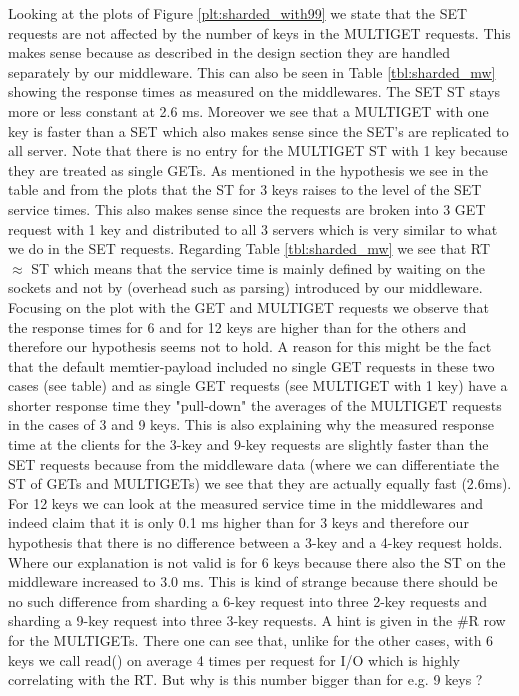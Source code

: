 \documentclass[11pt,a4paper]{article}
\begin{document}
Looking at the plots of Figure \ref{plt:sharded_with99} we state that the SET requests are not affected by the number of keys in the MULTIGET requests. This makes sense because as described in the design section they are handled separately by our middleware. This can also be seen in Table \ref{tbl:sharded_mw} showing the response times as measured on the middlewares. The SET ST stays more or less constant at 2.6 ms. Moreover we see that a MULTIGET with one key is faster  than a SET which also makes sense since the SET's are replicated to all server. Note that there is no entry for the MULTIGET ST with 1 key because they are treated as single GETs. As mentioned in the hypothesis we see in the table and from the plots that the ST for 3 keys raises to the level of the SET service times. This also makes sense since the requests are broken into 3 GET request with 1 key and distributed to all 3 servers which is very similar to what we do in the SET requests. Regarding Table \ref{tbl:sharded_mw} we see that RT $\approx$ ST which means that the service time is mainly defined by waiting on the sockets and not by (overhead such as parsing) introduced by our middleware. Focusing on the plot with the GET and MULTIGET requests we observe that the response times for 6 and for 12 keys are higher than for the others and therefore our hypothesis seems not to hold. A reason for this might be the fact that the default memtier-payload included no single GET requests in these two cases (see table) and as single GET requests (see MULTIGET with 1 key) have a shorter response time they "pull-down" the averages of the MULTIGET requests in the cases of 3 and 9 keys. This is also explaining why the measured response time at the clients for the 3-key and 9-key requests are slightly faster than the SET requests because from the middleware data (where we can differentiate the ST of GETs and MULTIGETs) we see that they are actually equally fast (2.6ms). For 12 keys we can look at the measured service time in the middlewares and indeed claim that it is only 0.1 ms higher than for 3 keys and therefore our hypothesis that there is no difference between a 3-key and a 4-key request holds. Where our explanation is not valid is for 6 keys because there also the ST on the middleware increased to 3.0 ms. This is kind of strange because there should be no such difference from sharding a 6-key request into three 2-key requests and sharding a 9-key request into three 3-key requests. A hint is given in the \#R row for the MULTIGETs. There one can see that, unlike for the other cases, with 6 keys we call read() on average 4 times per request for I/O which is highly correlating with the RT. But why is this number bigger than for e.g. 9 keys ? \\
\end{document}
